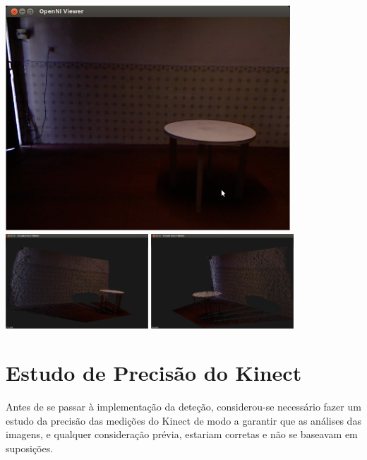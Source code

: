 \begin{center}
	\includegraphics[width=0.8\textwidth]{figures/experiencia/exp4.png}\\
	\includegraphics[width=0.4\textwidth]{figures/exemplo_captura_perspectiva1.png}
	\includegraphics[width=0.4\textwidth]{figures/exemplo_captura_perspectiva2.png}

	\label{fig:exemplo_captura}
\end{center}


\section{Estudo de Precisão do Kinect}

Antes de se passar à implementação da deteção, considerou-se necessário fazer um estudo da precisão das medições do Kinect de modo a garantir que as análises das imagens, e qualquer consideração prévia, estariam corretas e não se baseavam em suposições.

